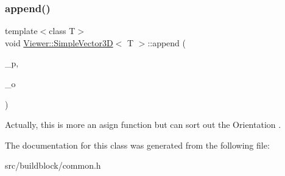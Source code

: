 \subsubsection{\texorpdfstring{append()}{append()}\hspace{0.1cm}{\footnotesize\ttfamily [2/2]}}
{\footnotesize\ttfamily template$<$class T$>$ \\
void \mbox{\hyperlink{classViewer_1_1SimpleVector3D}{Viewer\+::\+Simple\+Vector3D}}$<$ T $>$\+::append (\begin{DoxyParamCaption}\item[{const \mbox{\hyperlink{classViewer_1_1SimpleVector2D}{Simple\+Vector2D}}$<$ T $>$ \&}]{\+\_\+p,  }\item[{const Orientation $\ast$}]{\+\_\+o }\end{DoxyParamCaption})\hspace{0.3cm}{\ttfamily [inline]}}

Actually, this is more an asign function but can sort out the Orientation . 

The documentation for this class was generated from the following file\+:\begin{DoxyCompactItemize}
\item 
src/buildblock/common.\+h\end{DoxyCompactItemize}
